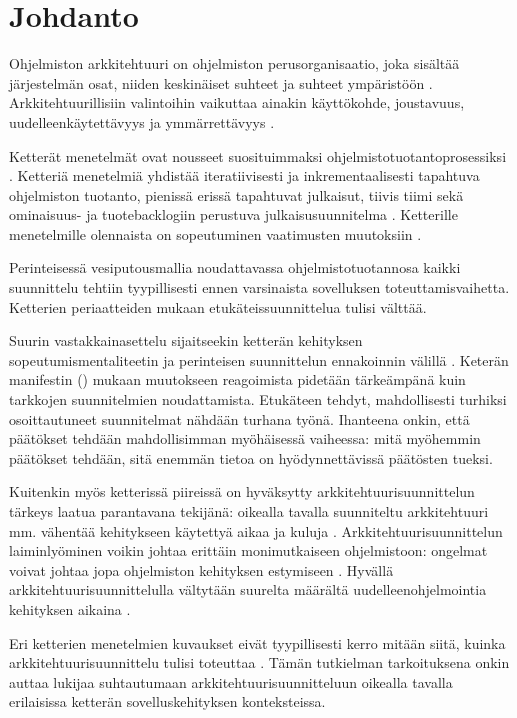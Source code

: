 \chapter{Johdanto}


Ohjelmiston arkkitehtuuri on ohjelmiston perusorganisaatio, joka sisältää järjestelmän osat, niiden keskinäiset suhteet ja suhteet ympäristöön \citep{jen_working_2000}. Arkkitehtuurillisiin valintoihin vaikuttaa ainakin käyttökohde, joustavuus, uudelleenkäytettävyys ja ymmärrettävyys \citep{kruchten2004rational}.

Ketterät menetelmät ovat nousseet suosituimmaksi ohjelmistotuotantoprosessiksi \citep{noauthor_14th_2020}. Ketteriä menetelmiä yhdistää iteratiivisesti ja inkrementaalisesti tapahtuva ohjelmiston tuotanto, pienissä erissä tapahtuvat julkaisut, tiivis tiimi sekä ominaisuus- ja tuotebacklogiin perustuva julkaisusuunnitelma \citep{babar_agile_2013}. Ketterille menetelmille olennaista on sopeutuminen vaatimusten muutoksiin \citep{fowler2001agile}. 

Perinteisessä vesiputousmallia noudattavassa ohjelmistotuotannosa kaikki suunnittelu tehtiin tyypillisesti ennen varsinaista sovelluksen toteuttamisvaihetta. Ketterien periaatteiden mukaan etukäteissuunnittelua tulisi välttää. 

Suurin vastakkainasettelu sijaitseekin ketterän kehityksen sopeutumismentaliteetin ja perinteisen suunnittelun ennakoinnin välillä \citep{babar_agile_2013}. Keterän manifestin (\citeyear{fowler2001agile}) mukaan muutokseen reagoimista pidetään tärkeämpänä kuin tarkkojen suunnitelmien noudattamista. Etukäteen tehdyt, mahdollisesti turhiksi osoittautuneet suunnitelmat nähdään turhana työnä. Ihanteena onkin, että päätökset tehdään mahdollisimman myöhäisessä vaiheessa: mitä myöhemmin päätökset tehdään, sitä enemmän tietoa on hyödynnettävissä päätösten tueksi.

Kuitenkin myös ketterissä piireissä on hyväksytty arkkitehtuurisuunnittelun tärkeys laatua parantavana tekijänä: oikealla tavalla suunniteltu arkkitehtuuri mm. vähentää kehitykseen käytettyä aikaa ja kuluja \citep{babar_agile_2013}. 
Arkkitehtuurisuunnittelun laiminlyöminen voikin johtaa erittäin monimutkaiseen ohjelmistoon: ongelmat voivat johtaa jopa ohjelmiston kehityksen estymiseen \citep{vogel2011software}. Hyvällä arkkitehtuurisuunnittelulla vältytään suurelta määrältä uudelleenohjelmointia kehityksen aikaina \citep{eloranta2015techniques}. 

Eri ketterien menetelmien kuvaukset eivät tyypillisesti kerro mitään siitä, kuinka arkkitehtuurisuunnittelu tulisi toteuttaa \citep{babar_agile_2013}. Tämän tutkielman tarkoituksena onkin auttaa lukijaa suhtautumaan arkkitehtuurisuunnitteluun oikealla tavalla erilaisissa ketterän sovelluskehityksen konteksteissa.

